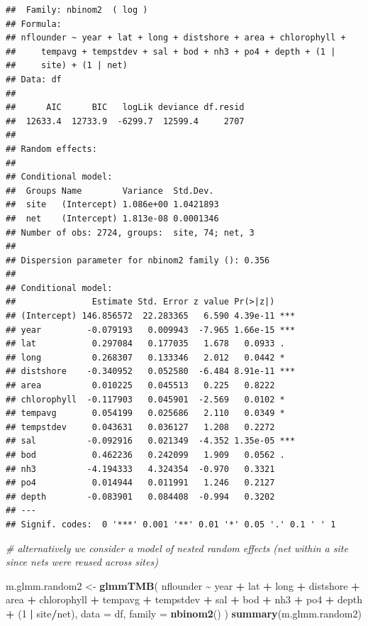 \documentclass[
]{article}
\newenvironment{Shaded}{\begin{snugshade}}{\end{snugshade}}
\newcommand{\AttributeTok}[1]{\textcolor[rgb]{0.13,0.29,0.53}{#1}}
\newcommand{\CommentTok}[1]{\textcolor[rgb]{0.56,0.35,0.01}{\textit{#1}}}
\newcommand{\DecValTok}[1]{\textcolor[rgb]{0.00,0.00,0.81}{#1}}
\newcommand{\FunctionTok}[1]{\textcolor[rgb]{0.13,0.29,0.53}{\textbf{#1}}}
\newcommand{\NormalTok}[1]{#1}
\newcommand{\OtherTok}[1]{\textcolor[rgb]{0.56,0.35,0.01}{#1}}
\newcommand{\SpecialCharTok}[1]{\textcolor[rgb]{0.81,0.36,0.00}{\textbf{#1}}}
\begin{document}
\begin{verbatim}
##  Family: nbinom2  ( log )
## Formula:          
## nflounder ~ year + lat + long + distshore + area + chlorophyll +  
##     tempavg + tempstdev + sal + bod + nh3 + po4 + depth + (1 |  
##     site) + (1 | net)
## Data: df
## 
##      AIC      BIC   logLik deviance df.resid 
##  12633.4  12733.9  -6299.7  12599.4     2707 
## 
## Random effects:
## 
## Conditional model:
##  Groups Name        Variance  Std.Dev. 
##  site   (Intercept) 1.086e+00 1.0421893
##  net    (Intercept) 1.813e-08 0.0001346
## Number of obs: 2724, groups:  site, 74; net, 3
## 
## Dispersion parameter for nbinom2 family (): 0.356 
## 
## Conditional model:
##               Estimate Std. Error z value Pr(>|z|)    
## (Intercept) 146.856572  22.283365   6.590 4.39e-11 ***
## year         -0.079193   0.009943  -7.965 1.66e-15 ***
## lat           0.297084   0.177035   1.678   0.0933 .  
## long          0.268307   0.133346   2.012   0.0442 *  
## distshore    -0.340952   0.052580  -6.484 8.91e-11 ***
## area          0.010225   0.045513   0.225   0.8222    
## chlorophyll  -0.117903   0.045901  -2.569   0.0102 *  
## tempavg       0.054199   0.025686   2.110   0.0349 *  
## tempstdev     0.043631   0.036127   1.208   0.2272    
## sal          -0.092916   0.021349  -4.352 1.35e-05 ***
## bod           0.462236   0.242099   1.909   0.0562 .  
## nh3          -4.194333   4.324354  -0.970   0.3321    
## po4           0.014944   0.011991   1.246   0.2127    
## depth        -0.083901   0.084408  -0.994   0.3202    
## ---
## Signif. codes:  0 '***' 0.001 '**' 0.01 '*' 0.05 '.' 0.1 ' ' 1
\end{verbatim}

\begin{Shaded}
\begin{Highlighting}[]
\CommentTok{\# alternatively we consider a model of nested random effects (net within a site since nets were reused across sites)}

\NormalTok{m.glmm.random2 }\OtherTok{\textless{}{-}} \FunctionTok{glmmTMB}\NormalTok{(}
\NormalTok{    nflounder }\SpecialCharTok{\textasciitilde{}}\NormalTok{ year }\SpecialCharTok{+}\NormalTok{ lat }\SpecialCharTok{+}\NormalTok{ long }\SpecialCharTok{+}\NormalTok{ distshore }\SpecialCharTok{+}\NormalTok{ area }\SpecialCharTok{+}\NormalTok{ chlorophyll }\SpecialCharTok{+}\NormalTok{ tempavg }\SpecialCharTok{+}\NormalTok{ tempstdev }\SpecialCharTok{+}\NormalTok{ sal }\SpecialCharTok{+}\NormalTok{ bod }\SpecialCharTok{+}\NormalTok{ nh3 }\SpecialCharTok{+}\NormalTok{ po4 }\SpecialCharTok{+}\NormalTok{ depth }\SpecialCharTok{+}\NormalTok{ (}\DecValTok{1} \SpecialCharTok{|}\NormalTok{ site}\SpecialCharTok{/}\NormalTok{net), }
    \AttributeTok{data =}\NormalTok{ df, }
    \AttributeTok{family =} \FunctionTok{nbinom2}\NormalTok{()}
\NormalTok{)}
\FunctionTok{summary}\NormalTok{(m.glmm.random2)}
\end{Highlighting}
\end{Shaded}
\end{document}
